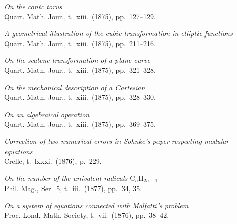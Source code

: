 \documentclass[11pt]{article}
\begin{document}
\begin{description}\itemsep=2pt
\item[615.] \textit{On the conic torus}\\
\hspace*{1em}\small Quart. Math. Jour., t.~xiii.\ (1875), pp.~127--129.

\item[616.] \textit{A geometrical illustration of the cubic transformation in elliptic functions}\\
\hspace*{1em}\small Quart. Math. Jour., t.~xiii.\ (1875), pp.~211--216.

\item[617.] \textit{On the scalene transformation of a plane curve}\\
\hspace*{1em}\small Quart. Math. Jour., t.~xiii.\ (1875), pp.~321--328.

\item[618.] \textit{On the mechanical description of a Cartesian}\\
\hspace*{1em}\small Quart. Math. Jour., t.~xiii.\ (1875), pp.~328--330.

\item[619.] \textit{On an algebraical operation}\\
\hspace*{1em}\small Quart. Math. Jour., t.~xiii.\ (1875), pp.~369--375.

\item[620.] \textit{Correction of two numerical errors in Sohnke's paper respecting modular equations}\\
\hspace*{1em}\small Crelle, t.~lxxxi.\ (1876), p.~229.

\item[621.] \textit{On the number of the univalent radicals $\mathrm{C}_{n}\mathrm{H}_{2n+1}$}\\
\hspace*{1em}\small Phil. Mag., Ser.~5, t.~iii.\ (1877), pp.~34, 35.

\item[622.] \textit{On a system of equations connected with Malfatti's problem}\\
\hspace*{1em}\small Proc. Lond. Math. Society, t.~vii.\ (1876), pp.~38--42.


\end{description}
\end{document}

